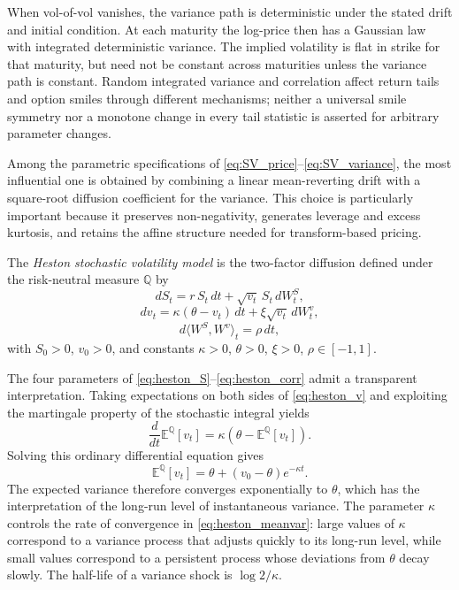 When vol-of-vol vanishes, the variance path is deterministic under
the stated drift and initial condition. At each maturity the log-price
then has a Gaussian law with integrated deterministic variance. The
implied volatility is flat in strike for that maturity, but need not
be constant across maturities unless the variance path is constant.
Random integrated variance and correlation affect return tails and
option smiles through different mechanisms; neither a universal
smile symmetry nor a monotone change in every tail statistic is
asserted for arbitrary parameter changes.

Among the parametric specifications of
\eqref{eq:SV_price}--\eqref{eq:SV_variance}, the most influential one is
obtained by combining a linear mean-reverting drift with a square-root
diffusion coefficient for the variance. This choice is particularly
important because it preserves non-negativity, generates leverage and
excess kurtosis, and retains the affine structure needed for
transform-based pricing.

\begin{definition}
The \emph{Heston stochastic volatility model} is the two-factor diffusion
defined under the risk-neutral measure $\mathbb{Q}$ by
\begin{equation}\label{eq:heston_S}
dS_t
=
r\,S_t\,dt+\sqrt{v_t}\,S_t\,dW^{S}_t,
\end{equation}
\begin{equation}\label{eq:heston_v}
dv_t
=
\kappa(\theta-v_t)\,dt+\xi\sqrt{v_t}\,dW^{v}_t,
\end{equation}
\begin{equation}\label{eq:heston_corr}
d\langle W^{S},W^{v}\rangle_t
=
\rho\,dt,
\end{equation}
with $S_0>0$, $v_0>0$, and constants $\kappa>0$, $\theta>0$, $\xi>0$,
$\rho\in[-1,1]$.
\end{definition}

The four parameters of \eqref{eq:heston_S}--\eqref{eq:heston_corr} admit
a transparent interpretation. Taking expectations on both sides of
\eqref{eq:heston_v} and exploiting the martingale property of the
stochastic integral yields
\[
\frac{d}{dt}\mathbb{E}^{\mathbb{Q}}[v_t]
=
\kappa\left(\theta-\mathbb{E}^{\mathbb{Q}}[v_t]\right).
\]
Solving this ordinary differential equation gives
\begin{equation}\label{eq:heston_meanvar}
\mathbb{E}^{\mathbb{Q}}[v_t]
=
\theta+(v_0-\theta)e^{-\kappa t}.
\end{equation}
The expected variance therefore converges exponentially to $\theta$,
which has the interpretation of the long-run level of instantaneous
variance. The parameter $\kappa$ controls the rate of convergence in
\eqref{eq:heston_meanvar}: large values of $\kappa$ correspond to a
variance process that adjusts quickly to its long-run level, while small
values correspond to a persistent process whose deviations from $\theta$
decay slowly. The half-life of a variance shock is $\log 2/\kappa$.

